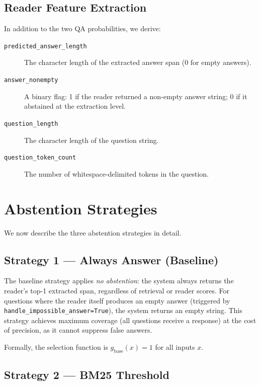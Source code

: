 \subsection{Reader Feature Extraction}

In addition to the two QA probabilities, we derive:

\begin{description}
  \item[\texttt{predicted\_answer\_length}] The character length of the
        extracted answer span (0 for empty answers).

  \item[\texttt{answer\_nonempty}] A binary flag: 1 if the reader returned a
        non-empty answer string; 0 if it abstained at the extraction level.

  \item[\texttt{question\_length}] The character length of the question string.

  \item[\texttt{question\_token\_count}] The number of whitespace-delimited
        tokens in the question.
\end{description}

\section{Abstention Strategies}
\label{sec:meth_strategies}

We now describe the three abstention strategies in detail.

\subsection{Strategy 1 — Always Answer (Baseline)}
\label{sec:meth_always_answer}

The baseline strategy applies \emph{no abstention}: the system always returns
the reader's top-1 extracted span, regardless of retrieval or reader scores.
For questions where the reader itself produces an empty answer (triggered by
\texttt{handle\_impossible\_answer=True}), the system returns an empty string.
This strategy achieves maximum coverage (all questions receive a response) at
the cost of precision, as it cannot suppress false answers.

Formally, the selection function is $g_\text{base}(x) = 1$ for all inputs $x$.

\subsection{Strategy 2 — BM25 Threshold}
\label{sec:meth_threshold}

